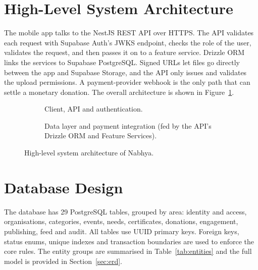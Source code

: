 \clearpage
\section{High-Level System Architecture}
The mobile app talks to the NestJS REST API over HTTPS. The API validates each request with Supabase Auth's JWKS endpoint, checks the role of the user, validates the request, and then passes it on to a feature service. Drizzle ORM links the services to Supabase PostgreSQL. Signed URLs let files go directly between the app and Supabase Storage, and the API only issues and validates the upload permissions. A payment-provider webhook is the only path that can settle a monetary donation. The overall architecture is shown in Figure~\ref{fig:architecture}.

\begin{figure}[H]
    \centering
    \begin{subfigure}[t]{\textwidth}
        \centering
        \caption{Client, API and authentication.}
    \end{subfigure}
    \par\vspace{0.2in}
    \begin{subfigure}[t]{\textwidth}
        \centering
        \caption{Data layer and payment integration (fed by the API's Drizzle ORM and Feature Services).}
    \end{subfigure}
    \caption{High-level system architecture of Nabhya.}
    \label{fig:architecture}
\end{figure}

\section{Database Design}
The database has 29 PostgreSQL tables, grouped by area: identity and access, organisations, categories, events, needs, certificates, donations, engagement, publishing, feed and audit. All tables use UUID primary keys. Foreign keys, status enums, unique indexes and transaction boundaries are used to enforce the core rules. The entity groups are summarised in Table~\ref{tab:entities} and the full model is provided in Section~\ref{sec:erd}.

